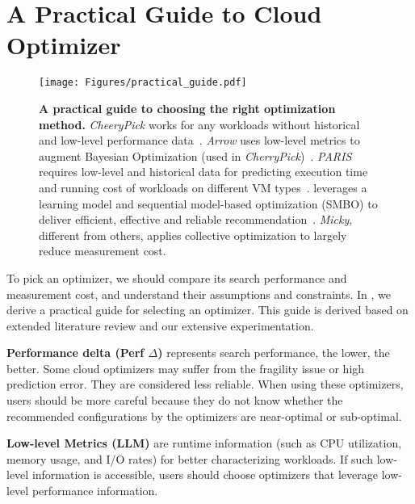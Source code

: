\section{A Practical Guide to Cloud Optimizer}
\label{sec:guide}


\begin{figure*}[t]
 \texttt{[image: Figures/practical\_guide.pdf]}
 \vspace*{-2mm}
 \centering
 \caption{\textbf{A practical guide to choosing the right optimization method.} \emph{CheeryPick} works for any workloads without historical and low-level performance data~\cite{Alipourfard2017}. \emph{Arrow} uses low-level metrics to augment Bayesian Optimization (used in \emph{CherryPick})~\cite{Hsu2018Arrow}.  \emph{PARIS} requires low-level and historical data for predicting execution time and running cost of workloads on different VM types~\cite{Yadwadkar2017}.  \scout leverages a learning model and sequential model-based optimization (SMBO) to deliver efficient, effective and reliable recommendation~\cite{Hsu2018Scout}.  \emph{Micky}, different from others, applies collective optimization to largely reduce measurement cost.}
 \label{fig:practical_guide}
 \vspace*{-4mm}
\end{figure*}


To pick an optimizer, we should compare its search performance and measurement cost, and understand their assumptions and constraints.
In \myfigure{\ref{fig:practical_guide}}, we derive a practical guide
for selecting an optimizer.
This guide is derived based on extended literature review and our extensive experimentation.

\textbf{Performance delta (Perf $\Delta$)}
represents search performance, the lower, the better.
Some cloud optimizers may suffer from
the fragility issue or high prediction error.
They are considered less reliable.
When using these optimizers, users should be more careful
because they do not know whether the recommended configurations by the optimizers are near-optimal or sub-optimal.

\textbf{Low-level Metrics (LLM)} are runtime information (such as CPU utilization, memory usage, and I/O rates) for better characterizing
workloads.
If such low-level information is accessible, users should choose optimizers that leverage low-level performance information.

